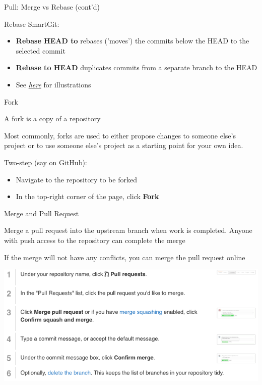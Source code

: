 \documentclass[hyperref,compress,handout,9pt,usepdftitle=false]{beamer}
\begin{document}
\begin{frame}{Pull: Merge vs Rebase (cont'd)}
	\begin{witemize}
		\item Rebase SmartGit: 
		\begin{itemize}
			\item \textbf{Rebase HEAD to} rebases ('moves') the commits below the HEAD to the selected commit
			\item \textbf{Rebase to HEAD} duplicates commits from a separate branch to the HEAD
			\item See \href{http://www.syntevo.com/doc/display/SG/Rebase}{\textit{here}} for illustrations
		\end{itemize}
		
	
		
		
	\end{witemize}
\end{frame}


\begin{frame}{Fork}
\begin{witemize}
\item  A fork is a copy of a repository
\item Most commonly, forks are used to either propose changes to someone else's project or to use someone else's project as a starting point for your own idea.
\item Two-step (say on GitHub): 
\begin{itemize}
	\item Navigate to the repository to be forked
	\item In the top-right corner of the page, click \textbf{Fork}
\end{itemize}
\end{witemize}
\end{frame}

\begin{frame}{Merge and Pull Request}
\begin{witemize}
\item  Merge a pull request into the upstream branch when work is completed. Anyone with push access to the repository can complete the merge
\item If the merge will not have any conflicts, you can merge the pull request online
\begin{center}
	\includegraphics[width=1.0\textwidth]{pull_request}
\end{center}
\end{witemize}
\end{frame}
\end{document}
